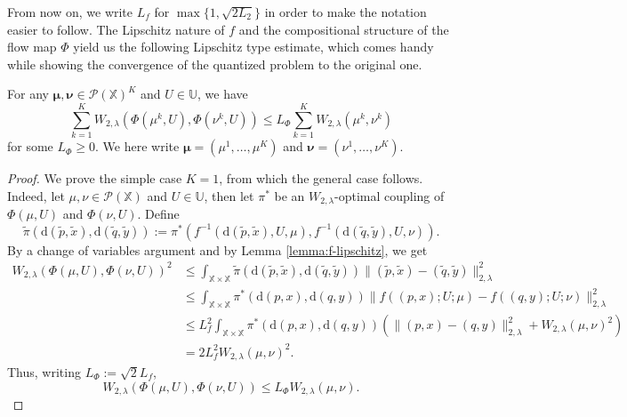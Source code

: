 \documentclass[11pt]{article}
\newcommand{\XX}{\mathbb{X}}
\newcommand{\UU}{\mathbb{U}}
\newcommand{\cP}{\mathcal{P}}
\newcommand{\de}{\mathrm{d}} %
\begin{document}
From now on, we write $L_f$ for $\max\{1, \sqrt{2L_2}\}$ in order to make the notation easier to follow. The Lipschitz nature of $f$ and the compositional structure of the flow map $\Phi$ yield us the following Lipschitz type estimate, which comes handy while showing the convergence of the quantized problem to the original one.
\begin{corollary}\label{cor:phi-lipschitz}
    For any $\bm{\mu},\bm{\nu}\in\cP(\XX)^K$ and $U\in\UU$, we have
    \begin{equation*}
        \sum_{k=1}^K W_{2,\lambda}(\Phi(\mu^k,U), \Phi(\nu^k, U)) \leq L_\Phi \sum_{k=1}^KW_{2,\lambda}(\mu^k,\nu^k)
    \end{equation*}
    for some $L_\Phi \geq 0$. We here write $\bm{\mu} = (\mu^1,\ldots,\mu^K)$ and $\bm{\nu} = (\nu^1,\ldots,\nu^K)$.
\end{corollary}
\begin{proof}
    We prove the simple case $K=1$, from which the general case follows. Indeed, let $\mu,\nu\in\cP(\XX)$ and $U\in\UU$, then let $\pi^*$ be an $W_{2,\lambda}$-optimal coupling of $\Phi(\mu,U)$ and $\Phi(\nu, U)$. Define
    \begin{equation*}
        \tilde{\pi}(\de(\tilde{p},\tilde{x}),\de(\tilde{q}, \tilde{y})) := \pi^*(f^{-1}(\de(\tilde{p},\tilde{x}), U, \mu), f^{-1}(\de(\tilde{q}, \tilde{y}), U, \nu)).
    \end{equation*}
    By a change of variables argument and by Lemma \ref{lemma:f-lipschitz}, we get
    \begin{align*}
        W_{2,\lambda}(\Phi(\mu,U), \Phi(\nu, U))^2 &\leq \int_{\XX\times\XX} \tilde{\pi}(\de(\tilde{p},\tilde{x}),\de(\tilde{q},\tilde{y})) \|(\tilde{p},\tilde{x})-(\tilde{q}, \tilde{y})\|_{2,\lambda}^2\\
        &\leq\int_{\XX\times\XX}\pi^*(\de(p,x), \de(q,y))\|f((p,x);U;\mu)-f((q,y);U;\nu)\|_{2,\lambda}^2\\
        &\leq L_f^2\int_{\XX\times\XX}\pi^*(\de(p,x), \de(q,y))(\|(p,x)-(q,y)\|_{2,\lambda}^2 + W_{2,\lambda}(\mu,\nu)^2)\\
        &=2L_f^2 W_{2,\lambda}(\mu,\nu)^2.
    \end{align*}
    Thus, writing $L_\Phi := \sqrt{2}L_f$,
    \begin{equation*}
        W_{2,\lambda}(\Phi(\mu,U), \Phi(\nu, U)) \leq L_\Phi W_{2,\lambda}(\mu,\nu).
    \end{equation*}
\end{proof}
\end{document}
